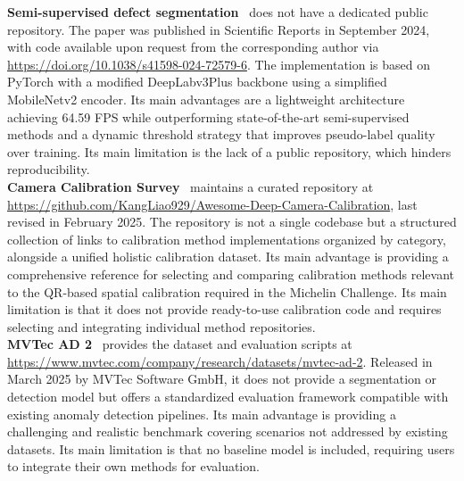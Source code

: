 \documentclass[11pt]{article}
\begin{document}
\textbf{Semi-supervised defect segmentation}~\cite{Shi2024SemiSupervised} does not 
have a dedicated public repository. The paper was published in Scientific Reports in 
September 2024, with code available upon request from the corresponding author via 
\url{https://doi.org/10.1038/s41598-024-72579-6}. The implementation is based on 
PyTorch with a modified DeepLabv3Plus backbone using a simplified MobileNetv2 
encoder. Its main advantages are a lightweight architecture achieving 64.59 FPS 
while outperforming state-of-the-art semi-supervised methods and a dynamic threshold 
strategy that improves pseudo-label quality over training. Its main limitation is 
the lack of a public repository, which hinders reproducibility.\\

\textbf{Camera Calibration Survey}~\cite{Liao2025CameraCalibration} maintains a 
curated repository at 
\url{https://github.com/KangLiao929/Awesome-Deep-Camera-Calibration}, last revised 
in February 2025. The repository is not a single codebase but a structured 
collection of links to calibration method implementations organized by category, 
alongside a unified holistic calibration dataset. Its main advantage is providing a 
comprehensive reference for selecting and comparing calibration methods relevant to 
the QR-based spatial calibration required in the Michelin Challenge. Its main 
limitation is that it does not provide ready-to-use calibration code and requires 
selecting and integrating individual method repositories.\\

\textbf{MVTec AD 2}~\cite{HecklerKram2025MVTecAD2} provides the dataset and 
evaluation scripts at \url{https://www.mvtec.com/company/research/datasets/mvtec-ad-2}. 
Released in March 2025 by MVTec Software GmbH, it does not provide a segmentation 
or detection model but offers a standardized evaluation framework compatible with 
existing anomaly detection pipelines. Its main advantage is providing a challenging 
and realistic benchmark covering scenarios not addressed by existing datasets. Its 
main limitation is that no baseline model is included, requiring users to integrate 
their own methods for evaluation.\\
\end{document}
